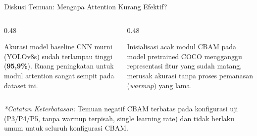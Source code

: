 \documentclass[aspectratio=169,10pt]{beamer}
\begin{document}
\begin{frame}{Diskusi Temuan: Mengapa Attention Kurang Efektif?}
    \begin{columns}[t]
        \begin{column}{0.48\textwidth}
            \centering
            \colorbox{primary!10}{}
            \vspace{0.8em}
            
            \small
            Akurasi model baseline CNN murni (YOLOv8s) sudah terlampau tinggi (\textbf{95,9\%}). Ruang peningkatan untuk modul attention sangat sempit pada dataset ini.
        \end{column}
        
        \begin{column}{0.48\textwidth}
            \centering
            \colorbox{primary!10}{}
            \vspace{0.8em}
            
            \small
            Inisialisasi acak modul CBAM pada model pretrained COCO mengganggu representasi fitur yang sudah matang, merusak akurasi tanpa proses pemanasan (\textit{warmup}) yang lama.
        \end{column}
    \end{columns}
    
    \vspace{1.5em}
    \centering
    \footnotesize \textit{*Catatan Keterbatasan:} Temuan negatif CBAM terbatas pada konfigurasi uji (P3/P4/P5, tanpa warmup terpisah, single learning rate) dan tidak berlaku umum untuk seluruh konfigurasi CBAM.
\end{frame}
\end{document}
